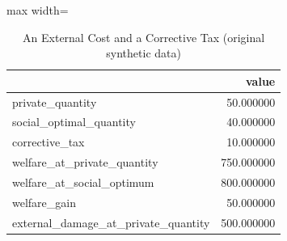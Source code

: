 \begin{table}[htbp]
\centering
\caption{An External Cost and a Corrective Tax (original synthetic data)}
\begingroup
\small
\setlength{\tabcolsep}{6pt}
\renewcommand{\arraystretch}{1.12}
\begin{adjustbox}{max width=\linewidth}
\begin{tabular}{@{}lr@{}}
\toprule
 & value \\
\midrule
private\_quantity & 50.000000 \\
social\_optimal\_quantity & 40.000000 \\
corrective\_tax & 10.000000 \\
welfare\_at\_private\_quantity & 750.000000 \\
welfare\_at\_social\_optimum & 800.000000 \\
welfare\_gain & 50.000000 \\
external\_damage\_at\_private\_quantity & 500.000000 \\
\bottomrule
\end{tabular}
\end{adjustbox}
\endgroup
\end{table}